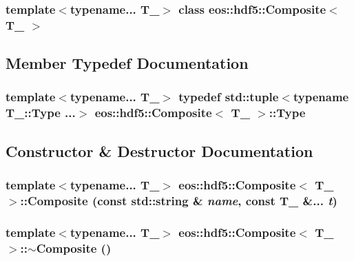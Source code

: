 \subsubsection*{template$<$typename... T\_\-$>$ class eos::hdf5::Composite$<$ T\_\- $>$}



\subsection{Member Typedef Documentation}
\hypertarget{classeos_1_1hdf5_1_1Composite_ada7dfe0d889983cbb27abbaffdeb1220}{
\subsubsection[{Type}]{\setlength{\rightskip}{0pt plus 5cm}template$<$typename... T\_\-$>$ typedef std::tuple$<$typename T\_\-::Type ...$>$ {\bf eos::hdf5::Composite}$<$ T\_\- $>$::{\bf Type}}}
\label{classeos_1_1hdf5_1_1Composite_ada7dfe0d889983cbb27abbaffdeb1220}


\subsection{Constructor \& Destructor Documentation}
\hypertarget{classeos_1_1hdf5_1_1Composite_a191269a71c496e5ec3b4514400cfe6f4}{
\subsubsection[{Composite}]{\setlength{\rightskip}{0pt plus 5cm}template$<$typename... T\_\-$>$ {\bf eos::hdf5::Composite}$<$ T\_\- $>$::{\bf Composite} (const std::string \& {\em name}, \/  const T\_\- \&... {\em t})}}
\label{classeos_1_1hdf5_1_1Composite_a191269a71c496e5ec3b4514400cfe6f4}
\hypertarget{classeos_1_1hdf5_1_1Composite_af9412e3240e5916899327e756407057f}{
\subsubsection[{$\sim$Composite}]{\setlength{\rightskip}{0pt plus 5cm}template$<$typename... T\_\-$>$ {\bf eos::hdf5::Composite}$<$ T\_\- $>$::$\sim${\bf Composite} ()}}
\label{classeos_1_1hdf5_1_1Composite_af9412e3240e5916899327e756407057f}


